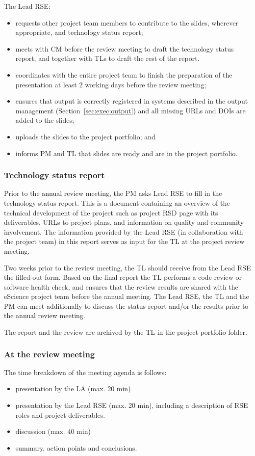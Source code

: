 The Lead RSE:
\begin{itemize}
\item requests other project team members to contribute to the slides, wherever appropriate, and technology status report;
\item meets with CM before the review meeting to draft the technology status report, and together with TLs to draft the rest
of the report.
\item coordinates with the entire project team to finish the preparation of the presentation at least 2 working days before
the review meeting;
\item ensures that output is correctly registered in systems described in the output management (Section~\ref{sec:exec:output}) 
  and all missing URLs and DOIs are added to the slides;
\item uploads the slides to the project portfolio; and
\item informs PM and TL that slides are ready and are in the project portfolio.
\end{itemize}

\subsubsection{Technology status report}
\label{sec:exec:tech}
Prior to the annual review meeting, the PM asks Lead RSE to fill in the technology status report. This is a document
containing an overview of the technical development of the project such as project RSD page with its deliverables, URLs
to project plans, and information on quality and community involvement. The information provided by the Lead RSE (in
collaboration with the project team) in this report serves as input for the TL at the project review meeting.

Two weeks prior to the review meeting, the TL should receive from the Lead RSE the filled-out
form. Based on the final report the TL performs a code review or software health check, and ensures that the review
results are shared with the eScience project team before the annual meeting. The Lead RSE, the TL and the PM can meet
additionally to discuss the status report and/or the results prior to the annual review meeting.

The report and the review are archived by the TL in the project portfolio folder.

\subsubsection{At the review meeting}
The time breakdown of the meeting agenda is follows:
\begin{itemize}
\item presentation by the LA (max. 20 min)
\item presentation by the Lead RSE (max. 20 min), including a description of RSE roles and project deliverables.
\item discussion (max. 40 min)
\item summary, action points and conclusions.
\end{itemize}

